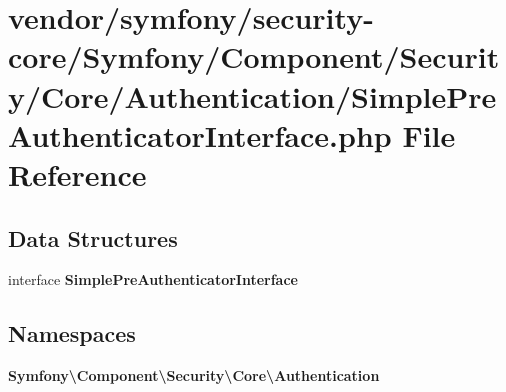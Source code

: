 \section{vendor/symfony/security-\/core/\+Symfony/\+Component/\+Security/\+Core/\+Authentication/\+Simple\+Pre\+Authenticator\+Interface.php File Reference}
\label{_simple_pre_authenticator_interface_8php}
\subsection*{Data Structures}
\begin{DoxyCompactItemize}
\item 
interface {\bf Simple\+Pre\+Authenticator\+Interface}
\end{DoxyCompactItemize}
\subsection*{Namespaces}
\begin{DoxyCompactItemize}
\item 
 {\bf Symfony\textbackslash{}\+Component\textbackslash{}\+Security\textbackslash{}\+Core\textbackslash{}\+Authentication}
\end{DoxyCompactItemize}
